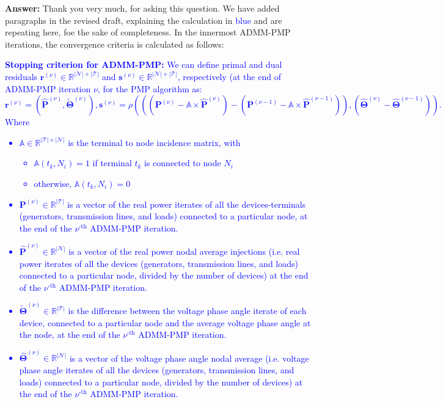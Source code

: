\documentclass[8pt]{article}
\begin{document}
\textbf{Answer: }Thank you very much, for asking this question. We have added paragraphs in the revised draft, explaining the calculation in \textcolor{blue}{blue} and are repeating here, foe the sake of completeness. In the innermost ADMM-PMP iterations, the convergence criteria is calculated as follows:\\
\textcolor{blue}{\textbf{Stopping criterion for ADMM-PMP: }We can define primal and dual residuals ${\mathbf{r}}^{(\nu)}\in\mathbb{R}^{|\mathcal{N}|+|\mathcal{T}|}$ and ${\mathbf{s}}^{(\nu)}\in\mathbb{R}^{|\mathcal{N}|+|\mathcal{T}|}$, respectively (at the end of ADMM-PMP iteration $\nu$, for the
PMP algorithm as:
\[
{\mathbf{r}}^{(\nu)} = \left(\hat {\mathbf{P}}^{(\nu)}, \tilde{\mathbf{\Theta}}^{(\nu)}\right),
{\mathbf{s}}^{(\nu)} = \rho\left((({\mathbf{P}}^{(\nu)} - \mathbb{A}\times\hat {\mathbf{P}}^{(\nu)}) - ({\mathbf{P}}^{(\nu-1)} - \mathbb{A}\times\hat {\mathbf{P}}^{(\nu-1)})), (\hat {\mathbf{\Theta}}^{(\nu)}- \hat {\mathbf{\Theta}}^{(\nu-1)})\right).
\]
Where \begin{itemize}
    \item $\mathbb{A}\in\mathbb{R}^{|\mathcal{T}|\times|\mathcal{N}|}$ is the terminal to node incidence matrix, with 
    \begin{itemize}
        \item $\mathbb{A}(t_k,N_i)=1$ if terminal $t_k$ is connected to node $N_i$
        \item otherwise, $\mathbb{A}(t_k,N_i)=0$
    \end{itemize}
    \item ${\mathbf{P}}^{(\nu)}\in\mathbb{R}^{|\mathcal{T}|}$ is a vector of the real power iterates of all the devices-terminals (generators, transmission lines, and loads) connected to a particular node, at the end of the $\nu^{\text{-th}}$ ADMM-PMP iteration.
    \item ${\hat{\mathbf{P}}}^{(\nu)}\in\mathbb{R}^{|\mathcal{N}|}$ is a vector of the real power nodal average injections (i.e. real power iterates of all the devices (generators, transmission lines, and loads) connected to a particular node, divided by the number of devices) at the end of the $\nu^{\text{-th}}$ ADMM-PMP iteration.
    \item $\tilde{\mathbf{\Theta}}^{(\nu)}\in\mathbb{R}^{|\mathcal{T}|}$ is the difference between the voltage phase angle iterate of each device, connected to a particular node and the average voltage phase angle at the node, at the end of the $\nu^{\text{-th}}$ ADMM-PMP iteration.
    \item ${\hat{\mathbf{\Theta}}}^{(\nu)}\in\mathbb{R}^{|\mathcal{N}|}$ is a vector of the voltage phase angle nodal average (i.e. voltage phase angle iterates of all the devices (generators, transmission lines, and loads) connected to a particular node, divided by the number of devices) at the end of the $\nu^{\text{-th}}$ ADMM-PMP iteration.

\end{itemize}}
\end{document}

